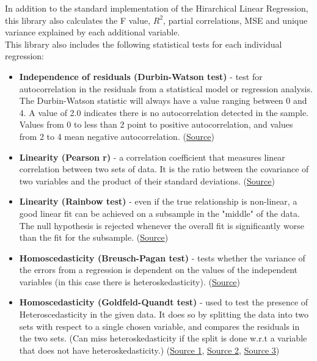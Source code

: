 \documentclass[11pt, oneside]{article}   	%
\begin{document}
In addition to the standard implementation of the Hirarchical Linear Regression, this library also calculates the F value, $R^2$, partial correlations, MSE and unique variance explained by each additional variable.\\
This library also includes the following statistical tests for each individual regression:
\begin{itemize}\label{list:stat_tests}
    \item \textbf{Independence of residuals (Durbin-Watson test)} - test for autocorrelation in the residuals from a statistical model or regression analysis. The Durbin-Watson statistic will always have a value ranging between 0 and 4. A value of 2.0 indicates there is no autocorrelation detected in the sample. Values from 0 to less than 2 point to positive autocorrelation, and values from 2 to 4 mean negative autocorrelation. (\href{https://www.investopedia.com/terms/d/durbin-watson-statistic.asp#:~:text=The%20Durbin%20Watson%20(DW)%20statistic,autocorrelation%20detected%20in%20the%20sample.}{Source})
    \item \textbf{Linearity (Pearson r)} - a correlation coefficient that measures linear correlation between two sets of data. It is the ratio between the covariance of two variables and the product of their standard deviations. (\href{https://en.wikipedia.org/wiki/Pearson_correlation_coefficient}{Source})
    \item \textbf{Linearity (Rainbow test)} - even if the true relationship is non-linear, a good linear fit can be achieved on a subsample in the "middle" of the data. The null hypothesis is rejected whenever the overall fit is significantly worse than the fit for the subsample. (\href{https://search.r-project.org/CRAN/refmans/lmtest/html/raintest.html}{Source})
    \item \textbf{Homoscedasticity (Breusch-Pagan test)} - tests whether the variance of the errors from a regression is dependent on the values of the independent variables (in this case there is heteroskedasticity). (\href{https://en.wikipedia.org/wiki/Breusch%E2%80%93Pagan_test}{Source})
    \item \textbf{Homoscedasticity (Goldfeld-Quandt test)} - used to test the presence of Heteroscedasticity in the given data. It does so by splitting the data into two sets with respect to a single chosen variable, and compares the residuals in the two sets. (Can miss heteroskedasticity if the split is done w.r.t a variable that does not have heteroskedasticity.) (\href{https://www.geeksforgeeks.org/goldfeld-quandt-test/}{Source 1}, \href{https://stats.stackexchange.com/questions/468778/contradictory-results-between-breusch-pagan-test-and-goldfeld-quandt-test-in-pyt}{Source 2}, \href{https://en.wikipedia.org/wiki/Goldfeld%E2%80%93Quandt_test}{Source 3})

\end{itemize}
\end{document}
